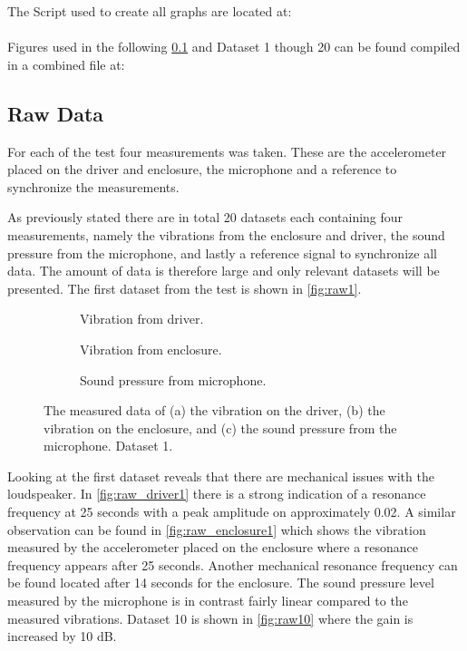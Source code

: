 The Script used to create all graphs are located at:\\
\\
Figures used in the following \ref{subsec:Raw_data_1} and Dataset 1 though 20 can be found compiled in a combined file at:


\subsection{Raw Data}\label{subsec:Raw_data_1}

For each of the test four measurements was taken. These are the accelerometer placed on the driver and enclosure, the microphone and a reference to synchronize the measurements. 

As previously stated there are in total 20 datasets each containing four measurements, namely the vibrations from the enclosure and driver, the sound pressure from the microphone, and lastly a reference signal to synchronize all data. The amount of data is therefore large and only relevant datasets will be presented. The first dataset from the test is shown in \autoref{fig:raw1}.


\begin{figure}[H]
\centering
\begin{subfigure}[t]{0.335\textwidth}
	
	\caption{Vibration from driver.}
	\label{fig:raw_driver1}
\end{subfigure}
\begin{subfigure}[t]{0.3\textwidth}
	
	\caption{Vibration from enclosure.}
	\label{fig:raw_enclosure1}
\end{subfigure}
\begin{subfigure}[t]{0.3\textwidth}
	
	\caption{Sound pressure from microphone.}
	\label{fig:raw_microphone1}
\end{subfigure}
\caption{The measured data of (a) the vibration on the driver, (b) the vibration on the enclosure, and (c) the sound pressure from the microphone. Dataset 1.}
\label{fig:raw1}
\end{figure} 


Looking at the first dataset reveals that there are mechanical issues with the loudspeaker. In \autoref{fig:raw_driver1} there is a strong indication of a resonance frequency at 25 seconds with a peak amplitude on approximately 0.02. A similar observation can be found in \autoref{fig:raw_enclosure1} which shows the vibration measured by the accelerometer placed on the enclosure where a resonance frequency appears after 25 seconds. Another mechanical resonance frequency can be found located after 14 seconds for the enclosure. The sound pressure level measured by the microphone is in contrast fairly linear compared to the measured vibrations. Dataset 10 is shown in \autoref{fig:raw10} where the gain is increased by 10 dB.

